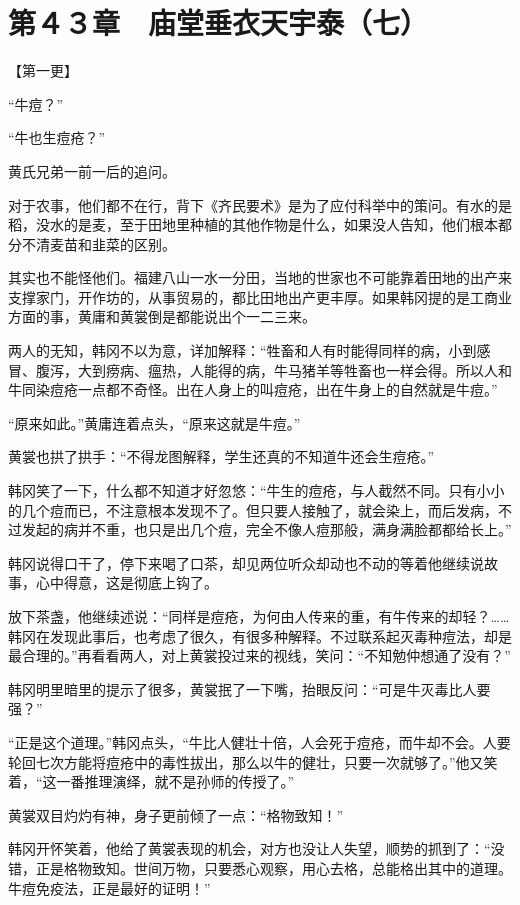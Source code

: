 \section{第４３章　庙堂垂衣天宇泰（七）}

【第一更】

“牛痘？”

“牛也生痘疮？”

黄氏兄弟一前一后的追问。

对于农事，他们都不在行，背下《齐民要术》是为了应付科举中的策问。有水的是稻，没水的是麦，至于田地里种植的其他作物是什么，如果没人告知，他们根本都分不清麦苗和韭菜的区别。

其实也不能怪他们。福建八山一水一分田，当地的世家也不可能靠着田地的出产来支撑家门，开作坊的，从事贸易的，都比田地出产更丰厚。如果韩冈提的是工商业方面的事，黄庸和黄裳倒是都能说出个一二三来。

两人的无知，韩冈不以为意，详加解释：“牲畜和人有时能得同样的病，小到感冒、腹泻，大到痨病、瘟热，人能得的病，牛马猪羊等牲畜也一样会得。所以人和牛同染痘疮一点都不奇怪。出在人身上的叫痘疮，出在牛身上的自然就是牛痘。”

“原来如此。”黄庸连着点头，“原来这就是牛痘。”

黄裳也拱了拱手：“不得龙图解释，学生还真的不知道牛还会生痘疮。”

韩冈笑了一下，什么都不知道才好忽悠：“牛生的痘疮，与人截然不同。只有小小的几个痘而已，不注意根本发现不了。但只要人接触了，就会染上，而后发病，不过发起的病并不重，也只是出几个痘，完全不像人痘那般，满身满脸都都给长上。”

韩冈说得口干了，停下来喝了口茶，却见两位听众却动也不动的等着他继续说故事，心中得意，这是彻底上钩了。

放下茶盏，他继续述说：“同样是痘疮，为何由人传来的重，有牛传来的却轻？……韩冈在发现此事后，也考虑了很久，有很多种解释。不过联系起灭毒种痘法，却是最合理的。”再看看两人，对上黄裳投过来的视线，笑问：“不知勉仲想通了没有？”

韩冈明里暗里的提示了很多，黄裳抿了一下嘴，抬眼反问：“可是牛灭毒比人要强？”

“正是这个道理。”韩冈点头，“牛比人健壮十倍，人会死于痘疮，而牛却不会。人要轮回七次方能将痘疮中的毒性拔出，那么以牛的健壮，只要一次就够了。”他又笑着，“这一番推理演绎，就不是孙师的传授了。”

黄裳双目灼灼有神，身子更前倾了一点：“格物致知！”

韩冈开怀笑着，他给了黄裳表现的机会，对方也没让人失望，顺势的抓到了：“没错，正是格物致知。世间万物，只要悉心观察，用心去格，总能格出其中的道理。牛痘免疫法，正是最好的证明！”

